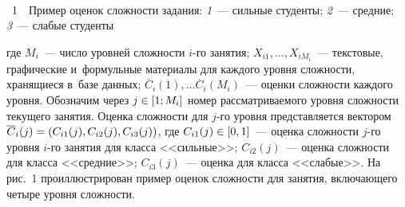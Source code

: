 \begin{multicols}{2}
 
 { \begin{center}  %
 \vspace*{1pt}
 \mbox{%
\epsfxsize=78.425mm
}
\end{center}



\noindent
{{\figurename~1}\ \ \small{Пример оценок сложности задания: \textit{1}~--- сильные студенты;
\textit{2}~--- средние; \textit{3}~--- слабые студенты}}
}

\vspace*{12pt}

\addtocounter{figure}{1}

 
 
 \noindent
  где $M_i$~--- число уровней сложности $i$-го занятия; $X_{i1},\ldots, 
X_{iM_i}$~--- текстовые, графические и~формульные материалы для каждого 
уровня слож\-ности, хранящиеся в~базе данных; $\overline{C}_i(1),\ldots 
\overline{C}_i(M_i)$~--- оценки слож\-ности каждого уровня. Обозначим через  
$j\hm\in [1;M_i]$ номер рассматриваемого уровня сложности текущего занятия. 
Оценка сложности для $j$-го уровня представляется вектором 
$\overline{C}_i(j)\hm= (C_{i1}(j), C_{i2}(j), C_{i3}(j))$, где $C_{i1}(j)\hm\in 
[0,1]$~--- оценка сложности $j$-го уровня $i$-го занятия для класса 
<<сильные>>; $C_{i2}(j)$~--- оценка сложности для класса <<средние>>; 
$C_{i3}(j)$~--- оценка для класса <<слабые>>. На рис.~1 проиллюстрирован 
пример оценок сложности для занятия, включающего четыре уровня 
сложности.

\begin{figure*}[b] %
 \vspace*{1pt}
\begin{center}
\mbox{%
\epsfxsize=165.499mm
}
\end{center}
\vspace*{-9pt}
  \end{figure*}
  


\end{multicols}

